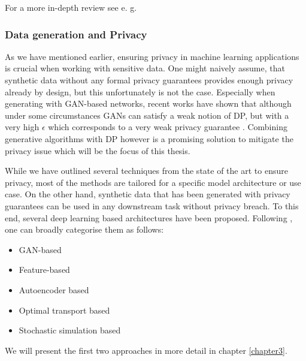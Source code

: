 \vspace*{1em}
For a more in-depth review see e. g. \parencite{surrve_ppml,surv_ppml_2,wang2023differential}


\subsubsection*{Data generation and Privacy}

As we have mentioned earlier, ensuring privacy in machine learning applications is crucial when working with sensitive data. One might naively assume, that synthetic data without any formal privacy guarantees provides enough privacy already by design, but this unfortunately is not the case. Especially when generating with GAN-based networks, recent works have shown that although under some circumstances GANs can satisfy a weak notion of DP, but with a very high $\epsilon$ which corresponds to a very weak privacy guarantee \parencite{lin2021privacy,stadler2022synthetic,jordon2022synthetic}. Combining generative algorithms with DP however is a promising solution to mitigate the privacy issue \parencite{bellovin2019privacy} which will be the focus of this thesis.

While we have outlined several techniques from the state of the art to ensure privacy, most of the methods are tailored for a specific model architecture or use case. On the other hand, synthetic data that has been generated with privacy guarantees can be used in any downstream task without privacy breach. To this end, several deep learning based architectures have been proposed. Following \parencite{hu2023sok}, one can broadly categorise them as follows:
\begin{itemize}
    \item GAN-based
    \item Feature-based
    \item Autoencoder based {\tiny \Parencite[see e. g.][for a generator based on a variational autoencoder that is trained with DP-SGD]{vae}}
    \item Optimal transport based {\tiny \Parencite[see e. g.][for generator based on the so-called Sinkhorn divergence]{cao2021dont}}
    \item Stochastic simulation based {\tiny \Parencite[see e. g.][for a differentially-private diffusion model]{dpgen}}
\end{itemize}

We will present the first two approaches in more detail in chapter \ref{chapter3}.

